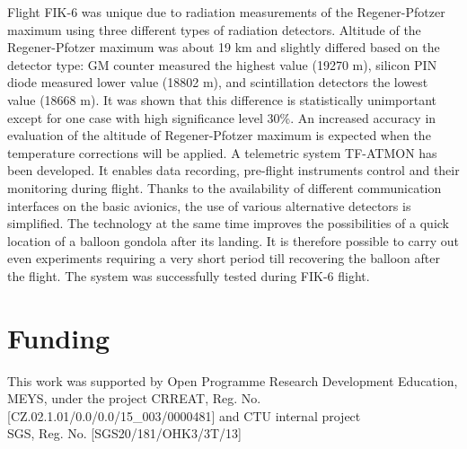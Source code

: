 \documentclass{Rpd}
\begin{document}
Flight FIK-6 was unique due to radiation measurements of the Regener-Pfotzer maximum using three different types of radiation detectors. Altitude of the Regener-Pfotzer maximum was about 19 km and slightly differed based on the detector type: GM counter measured the highest value (19270 m), silicon PIN diode measured lower value (18802 m), and scintillation detectors the lowest value (18668 m). It was shown that this difference is statistically unimportant except for one case with high significance level 30\%. An increased accuracy in evaluation of the altitude of Regener-Pfotzer maximum is expected when the temperature corrections will be applied.
A telemetric system TF-ATMON has been developed. It enables data recording, pre-flight instruments control and their monitoring during flight. Thanks to the availability of different communication interfaces on the basic avionics, the use of various alternative detectors is simplified. The technology at the same time improves the possibilities of a quick location of a balloon gondola after its landing. It is therefore possible to carry out even experiments requiring a very short period till recovering the balloon after the flight. The system was successfully tested during FIK-6 flight.

\section*{Funding}

This work was supported by Open Programme Research Development Education, MEYS, under the project CRREAT, \newline Reg. No. [CZ.02.1.01/0.0/0.0/15\_003/0000481] and CTU internal project \\ SGS, Reg. No. [SGS20/181/OHK3/3T/13]
\end{document}
